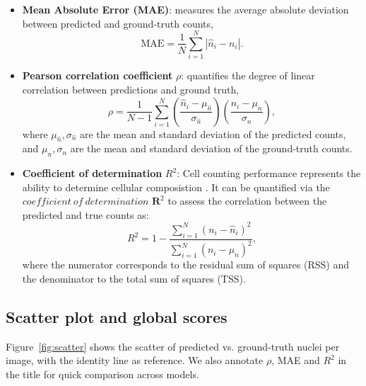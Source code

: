 \documentclass[target=bach,aauheader=,style=]{thud}
\begin{document}
\begin{itemize}
    \item \textbf{Mean Absolute Error (MAE)}: measures the average absolute deviation between predicted and ground-truth counts,
    \begin{equation}
        \mathrm{MAE} = \frac{1}{N}\sum_{i=1}^{N} \left| \hat{n}_i - n_i \right|.
    \end{equation}

    \item \textbf{Pearson correlation coefficient} $\rho$: quantifies the degree of linear correlation between predictions and ground truth,
    \begin{equation}
        \rho = \frac{1}{N-1}\sum_{i=1}^N 
        \left(\frac{\hat{n}_i - \mu_{\hat{n}}}{\sigma_{\hat{n}}}\right)
        \left(\frac{n_i - \mu_{n}}{\sigma_{n}}\right),
    \end{equation}
    where $\mu_{\hat{n}}, \sigma_{\hat{n}}$ are the mean and standard deviation of the predicted counts, and $\mu_{n}, \sigma_{n}$ are the mean and standard deviation of the ground-truth counts.

    \item \textbf{Coefficient of determination} $R^2$: Cell counting performance represents the ability to determine cellular composistion \cite{kirillov2019panoptic}. It can be quantified via the $coefficient\ of\ determination$ $\textbf{R}^2$ to assess the correlation between the predicted and true counts as:
    \begin{equation}
        R^2 = 1 - \frac{\sum_{i=1}^N (n_i - \hat{n}_i)^2}{\sum_{i=1}^N (n_i - \mu_{n})^2},
    \end{equation}
    where the numerator corresponds to the residual sum of squares (RSS) and the denominator to the total sum of squares (TSS).
\end{itemize}

\subsection{Scatter plot and global scores}
Figure~\ref{fig:scatter} shows the scatter of predicted vs. ground-truth nuclei per image, with the identity line as reference.
We also annotate $\rho$, MAE and $R^2$ in the title for quick comparison across models.
\end{document}
